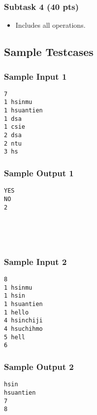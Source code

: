 \subsubsection{Subtask 4 (40 pts)}

\begin{itemize}
    \item Includes all operations.
\end{itemize}

\newpage

\subsection{Sample Testcases}

\begin{multicols}{2}
\subsubsection{Sample Input 1}
\begin{verbatim}
7
1 hsinmu
1 hsuantien
1 dsa
1 csie
2 dsa
2 ntu
3 hs
\end{verbatim}
\columnbreak
\subsubsection{Sample Output 1}
\begin{verbatim}
YES
NO
2





\end{verbatim}
\end{multicols}

\begin{multicols}{2}
\subsubsection{Sample Input 2}
\begin{verbatim}
8
1 hsinmu
1 hsin
1 hsuantien
1 hello
4 hsinchiji
4 hsuchihmo
5 hell
6
\end{verbatim}
\columnbreak
\subsubsection{Sample Output 2}
\begin{verbatim}
hsin
hsuantien
7
8





\end{verbatim}
\end{multicols}

